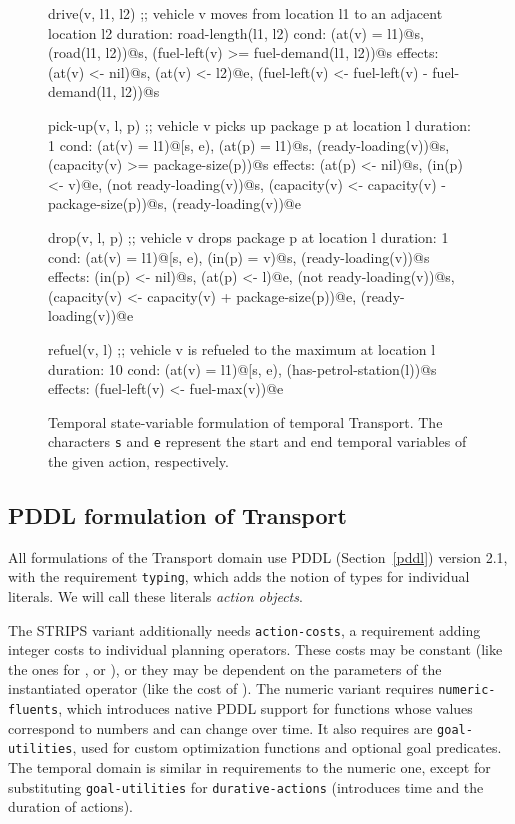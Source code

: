 \begin{figure}[tb]
\begin{code}
drive(v, l1, l2)
  ;; vehicle v moves from location l1 to an adjacent location l2
  duration: road-length(l1, l2)
  cond: (at(v) = l1)@s, (road(l1, l2))@s,
        (fuel-left(v) >= fuel-demand(l1, l2))@s
  effects: (at(v) <- nil)@s, (at(v) <- l2)@e,
           (fuel-left(v) <- fuel-left(v) - fuel-demand(l1, l2))@s

pick-up(v, l, p)
  ;; vehicle v picks up package p at location l
  duration: 1
  cond: (at(v) = l1)@[s, e), (at(p) = l1)@s, (ready-loading(v))@s,
        (capacity(v) >= package-size(p))@s
  effects: (at(p) <- nil)@s, (in(p) <- v)@e, (not ready-loading(v))@s,
           (capacity(v) <- capacity(v) - package-size(p))@s,
           (ready-loading(v))@e
  
drop(v, l, p)
  ;; vehicle v drops package p at location l
  duration: 1
  cond: (at(v) = l1)@[s, e), (in(p) = v)@s, (ready-loading(v))@s
  effects: (in(p) <- nil)@s, (at(p) <- l)@e, (not ready-loading(v))@s,
           (capacity(v) <- capacity(v) + package-size(p))@e,
           (ready-loading(v))@e
  
refuel(v, l)
  ;; vehicle v is refueled to the maximum at location l
  duration: 10
  cond: (at(v) = l1)@[s, e), (has-petrol-station(l))@s
  effects: (fuel-left(v) <- fuel-max(v))@e
\end{code}
\caption[State-variable formulation of temporal Transport.]{Temporal state-variable formulation of temporal Transport. The characters \texttt{s} and \texttt{e} represent the start and end temporal variables of the given action, respectively.}
\label{code:statevar-temporal}
\end{figure}

\subsection{PDDL formulation of Transport}

All formulations of the Transport domain use PDDL (Section~\ref{pddl}) version 2.1,
with the requirement \verb+typing+, which adds the notion of types for individual
literals. We will call these literals \textit{action objects}.

The STRIPS variant additionally needs \verb+action-costs+, a requirement adding
integer costs to individual planning operators. These costs may be constant
(like the ones for \pickup{}, \drop{} or ),
or they may be dependent on the parameters of the instantiated operator (like
the cost of \drive{}).
The numeric variant
requires \verb+numeric-fluents+, which introduces native PDDL support for functions whose values correspond to numbers and can change over time. It also requires are
\verb+goal-utilities+, used for custom optimization functions and optional goal predicates.
The temporal domain is similar in requirements to the numeric one, except for
substituting \verb+goal-utilities+ for \verb+durative-actions+ (introduces time
and the duration of actions).

